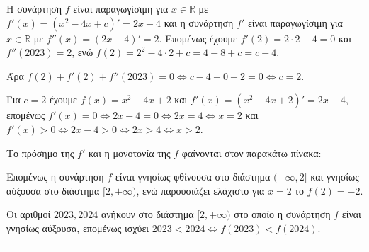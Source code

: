 
	\begin{alist}
		\item Η συνάρτηση $f$ είναι παραγωγίσιμη για $x \in \mathbb{R}$ με $f'(x) = (x^2 - 4x + c)' = 2x - 4$ και η συνάρτηση $f'$ είναι παραγωγίσιμη για $x \in \mathbb{R}$ με $f''(x) = (2x - 4)' = 2$. Επομένως έχουμε $f'(2) = 2 \cdot 2 - 4 = 0$ και $f''(2023) = 2$, ενώ $f(2) = 2^2 - 4 \cdot 2 + c = 4 - 8 + c = c - 4$.
		
		Άρα $f(2) + f'(2) + f''(2023) = 0 \Leftrightarrow c - 4 + 0 + 2 = 0 \Leftrightarrow c = 2$.
		
		\item Για $c=2$ έχουμε $f(x) = x^2 - 4x + 2$ και $f'(x) = (x^2 - 4x + 2)' = 2x - 4$, επομένως $f'(x) = 0 \Leftrightarrow 2x - 4 = 0 \Leftrightarrow 2x = 4 \Leftrightarrow x = 2$ και $f'(x) > 0 \Leftrightarrow 2x - 4 > 0 \Leftrightarrow 2x > 4 \Leftrightarrow x > 2$.
		
		Το πρόσημο της $f'$ και η μονοτονία της $f$ φαίνονται στον παρακάτω πίνακα:
		
		\begin{center}
		\end{center}
		
		Επομένως η συνάρτηση $f$ είναι γνησίως φθίνουσα στο διάστημα $(-\infty, 2]$ και γνησίως αύξουσα στο διάστημα $[2, +\infty)$, ενώ παρουσιάζει ελάχιστο για $x=2$ το $f(2)=-2$.
		
		\item Οι αριθμοί $2023, 2024$ ανήκουν στο διάστημα $[2, +\infty)$ στο οποίο η συνάρτηση $f$ είναι γνησίως αύξουσα, επομένως ισχύει $2023 < 2024 \Leftrightarrow f(2023) < f(2024)$.
	\end{alist}
\vspace{6mm}
\noindent\rule{\textwidth}{0.4pt}
\vspace{6mm}

